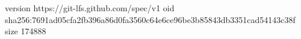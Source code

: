 version https://git-lfs.github.com/spec/v1
oid sha256:7691ad05cfa2fb396a86d0fa3560c64e6ce96be3b85843db3351cad54143c38f
size 174888
